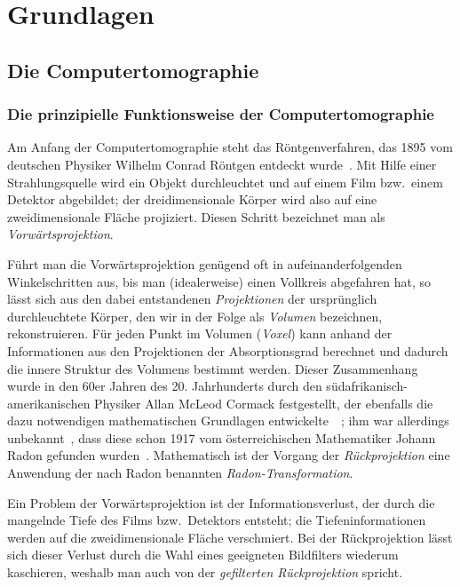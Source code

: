 \chapter{Grundlagen}

\section{Die Computertomographie}

\subsection{Die prinzipielle Funktionsweise der Computertomographie}

Am Anfang der Computertomographie steht das Röntgenverfahren, das 1895 vom deutschen Physiker Wilhelm Conrad Röntgen
entdeckt wurde~\cite{roentgen}. Mit Hilfe einer Strahlungsquelle wird ein Objekt durchleuchtet und auf einem Film bzw.\
einem Detektor abgebildet; der dreidimensionale Körper wird also auf eine zweidimensionale Fläche projiziert. Diesen
Schritt bezeichnet man als \textit{Vorwärtsprojektion}.

Führt man die Vorwärtsprojektion genügend oft in aufeinanderfolgenden Winkelschritten aus, bis man (idealerweise) einen
Vollkreis abgefahren hat, so lässt sich aus den dabei entstandenen \textit{Projektionen} der ursprünglich durchleuchtete
Körper, den wir in der Folge als \textit{Volumen} bezeichnen, rekonstruieren. Für jeden Punkt im Volumen
(\textit{Voxel}) kann anhand der Informationen aus den Projektionen der Absorptionsgrad berechnet und dadurch die
innere Struktur des Volumens bestimmt werden. Dieser Zusammenhang wurde in den 60er Jahren des 20. Jahrhunderts durch
den südafrikanisch-amerikanischen Physiker Allan McLeod Cormack festgestellt, der ebenfalls die dazu notwendigen
mathematischen Grundlagen entwickelte~\cite{cormack63}~\cite{cormack64}; ihm war allerdings unbekannt~\cite{cormack79},
dass diese schon 1917 vom österreichischen Mathematiker Johann Radon gefunden wurden~\cite{radon}. Mathematisch ist der
Vorgang der \textit{Rückprojektion} eine Anwendung der nach Radon benannten \textit{Radon-Transformation}.

Ein Problem der Vorwärtsprojektion ist der Informationsverlust, der durch die mangelnde Tiefe des Films bzw.\ Detektors
entsteht; die Tiefeninformationen werden auf die zweidimensionale Fläche {\glqq}verschmiert{\grqq}. Bei der
Rückprojektion lässt sich dieser Verlust durch die Wahl eines geeigneten Bildfilters wiederum kaschieren, weshalb man
auch von der \textit{gefilterten Rückprojektion} spricht.

